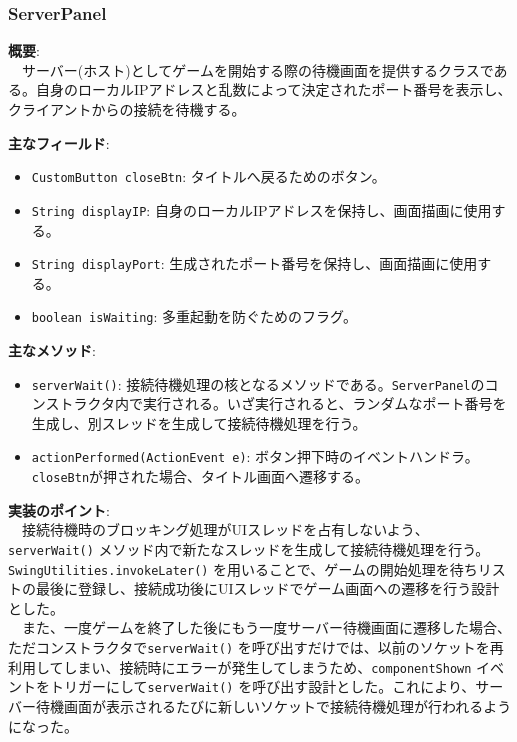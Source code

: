 \documentclass[11pt,a4j]{jarticle}
\begin{document}
\subsubsection{ServerPanel}
\noindent\textbf{概要}: \\
　サーバー(ホスト)としてゲームを開始する際の待機画面を提供するクラスである。自身のローカルIPアドレスと乱数によって決定されたポート番号を表示し、クライアントからの接続を待機する。

\noindent\textbf{主なフィールド}:
\begin{itemize}
    \item \texttt{CustomButton closeBtn}: タイトルへ戻るためのボタン。
    \item \texttt{String displayIP}: 自身のローカルIPアドレスを保持し、画面描画に使用する。
    \item \texttt{String displayPort}: 生成されたポート番号を保持し、画面描画に使用する。
    \item \texttt{boolean isWaiting}: 多重起動を防ぐためのフラグ。
\end{itemize}

\noindent\textbf{主なメソッド}:
\begin{itemize}
    \item \texttt{serverWait()}: 接続待機処理の核となるメソッドである。\texttt{ServerPanel}のコンストラクタ内で実行される。いざ実行されると、ランダムなポート番号を生成し、別スレッドを生成して接続待機処理を行う。
    \item \texttt{actionPerformed(ActionEvent e)}: ボタン押下時のイベントハンドラ。\texttt{closeBtn}が押された場合、タイトル画面へ遷移する。
\end{itemize}

\noindent\textbf{実装のポイント}: \\
　接続待機時のブロッキング処理がUIスレッドを占有しないよう、\texttt{serverWait()} メソッド内で新たなスレッドを生成して接続待機処理を行う。
\texttt{SwingUtilities.invokeLater()} を用いることで、ゲームの開始処理を待ちリストの最後に登録し、接続成功後にUIスレッドでゲーム画面への遷移を行う設計とした。\\
　また、一度ゲームを終了した後にもう一度サーバー待機画面に遷移した場合、ただコンストラクタで\texttt{serverWait()} を呼び出すだけでは、以前のソケットを再利用してしまい、接続時にエラーが発生してしまうため、\texttt{componentShown} イベントをトリガーにして\texttt{serverWait()} を呼び出す設計とした。これにより、サーバー待機画面が表示されるたびに新しいソケットで接続待機処理が行われるようになった。
\end{document}
